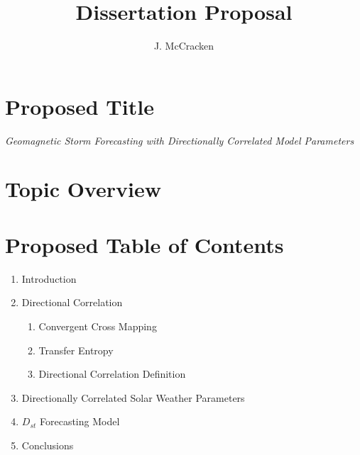 \documentclass[letter,11pt]{article}
\title{Dissertation Proposal}
\author{J. McCracken}
\begin{document}

\noindent\makebox[\linewidth]{\rule{\paperwidth}{0.4pt}}

\section*{Proposed Title}
{\em Geomagnetic Storm Forecasting with Directionally Correlated Model Parameters}

\section*{Topic Overview}

\section*{Proposed Table of Contents}
\begin{enumerate}
\item Introduction
\item Directional Correlation
\begin{enumerate}
\item Convergent Cross Mapping
\item Transfer Entropy
\item Directional Correlation Definition
\end{enumerate}
\item Directionally Correlated Solar Weather Parameters
\item $D_{st}$ Forecasting Model
\item Conclusions
\end{enumerate}
\end{document}
